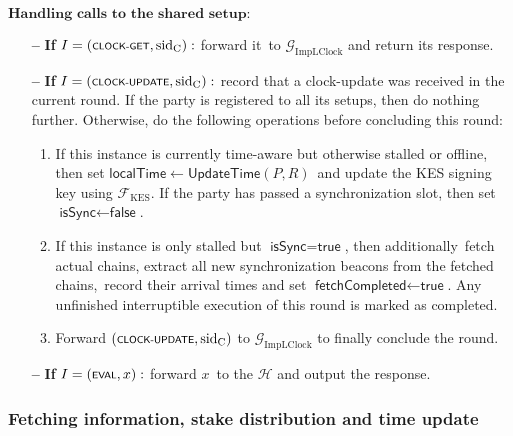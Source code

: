 \begin{protocol}
\begin{algorithmic}
        \State $\textbf{Handling calls to the shared setup:}$
        \begin{itemize}
            \item[\textbf{--}] \textbf{If} $I = (\textsf{\scriptsize{CLOCK-GET}}, \text{sid}_\text{C}):$ forward it\
            to $\mathcal{G}_{\text{ImpLClock}}$ and return its response.
            \item[\textbf{--}] \textbf{If} $I = (\textsf{\scriptsize{CLOCK-UPDATE}}, \text{sid}_\text{C}):$ record that a clock-update was received in the current round.
            If the party is registered to all its setups,  then do nothing further.
            Otherwise,  do the following operations before concluding this round:
            \begin{enumerate}
                \item If this instance is currently time-aware but otherwise stalled or offline, then set $\textsf{localTime} \leftarrow \textsf{UpdateTime}(P, R)$\
                and update the KES signing key using $\mathcal{F}_{\text{KES}}$.
                If the party has passed a synchronization slot, then set $\textsf{isSync}  \leftarrow  \textsf{false}$.
                \item If this instance is only stalled but $\textsf{isSync}  =  \textsf{true}$, then additionally\
                fetch actual chains, extract all new synchronization beacons from the fetched chains,\
                record their arrival times and set $\textsf{fetchCompleted}  \leftarrow  \textsf{true}$.
                Any unfinished interruptible execution of this round is marked as completed.
                \item Forward $(\textsf{\scriptsize{CLOCK-UPDATE}}, \text{sid}_\text{C})$ to $\mathcal{G}_{\text{ImpLClock}}$ to finally conclude the round.
            \end{enumerate}
            \item[\textbf{--}] \textbf{If} $I = (\textsf{\scriptsize{EVAL}}, x):$ forward $x$\
            to the $\mathcal{H}$ and output the response.
        \end{itemize}


    \end{algorithmic}\label{alg:spectrum-protocol}
\end{protocol}

\subsubsection{Fetching information, stake distribution and time update}


